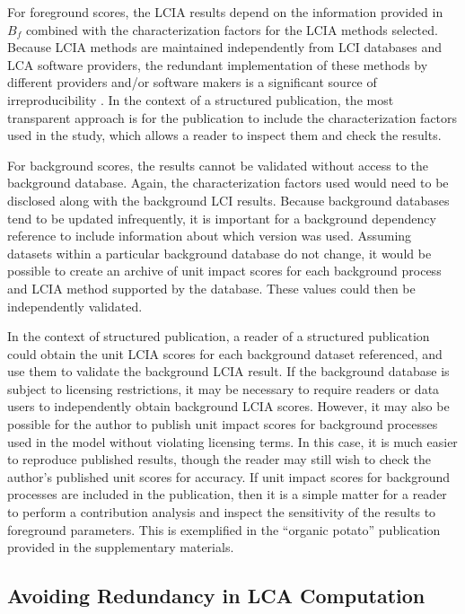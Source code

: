 For foreground scores, the LCIA results depend on the information provided in $B_f$ combined with the characterization factors for the LCIA methods selected.  Because LCIA methods are maintained independently from LCI databases and LCA software providers, the redundant implementation of these methods by different providers and/or software makers is a significant source of irreproducibility \citep{Speck_2015,Herrmann_2015}.  In the context of a structured publication, the most transparent approach is for the publication to include the characterization factors used in the study, which allows a reader to inspect them and check the results.  

For background scores, the results cannot be validated without access to the background database.  Again, the characterization factors used would need to be disclosed along with the background LCI results.  Because background databases tend to be updated infrequently, it is important for a background dependency reference to include information about which version was used.  Assuming datasets within a particular background database do not change, it would be possible to create an archive of unit impact scores for each background process and LCIA method supported by the database.  These values could then be independently validated.  

In the context of structured publication, a reader of a structured publication could obtain the unit LCIA scores for each background dataset referenced, and use them to validate the background LCIA result. If the background database is subject to licensing restrictions, it may be necessary to require readers or data users to independently obtain background LCIA scores.  However, it may also be possible for the author to publish unit impact scores for background processes used in the model without violating licensing terms. In this case, it is much easier to reproduce published results, though the reader may still wish to check the author's published unit scores for accuracy.  If unit impact scores for background processes are included in the publication, then it is a simple matter for a reader to perform a contribution analysis and inspect the sensitivity of the results to foreground parameters.  This is exemplified in the ``organic potato'' publication provided in the supplementary materials.  

\subsection{Avoiding Redundancy in LCA Computation}

